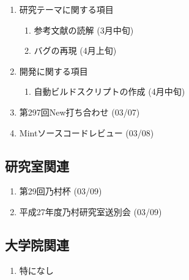 \documentclass[fleqn, 12pt]{extarticle}
\begin{document}
    \begin{enumerate}

        \item 研究テーマに関する項目
            \hfill
            \begin{enumerate}

                \item 参考文献の読解
                    \hfill
                    (3月中旬)

                \item バグの再現
                    \hfill
                    (4月上旬)

            \end{enumerate}

        \item 開発に関する項目
            \hfill
            \begin{enumerate}

                \item 自動ビルドスクリプトの作成
                    \hfill
                    (4月中旬)

            \end{enumerate}

        \item 第297回New打ち合わせ
            \hfill
            \label{enum-7}
            (03/07)

        \item Mintソースコードレビュー
            \hfill
            \label{enum-18}
            (03/08)

    \end{enumerate}

    \subsection{研究室関連}
    \label{sec-4-2}

    \begin{enumerate}

        \item 第29回乃村杯
            \hfill
            \label{enum-18}
            (03/09)

        \item 平成27年度乃村研究室送別会
            \hfill
            \label{enum-18}
            (03/09)

    \end{enumerate}

    \subsection{大学院関連}
    \begin{enumerate}

        \item 特になし
            \hfill
            \label{enum-17}

    \end{enumerate}
\end{document}
